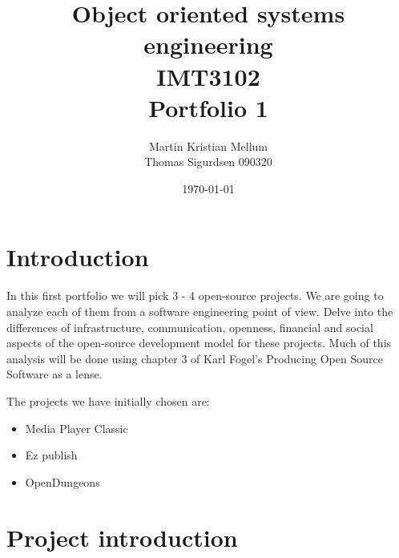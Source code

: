 \documentclass{report} %
\title{Object oriented systems engineering \\ IMT3102 \\ Portfolio 1}
\author{Martin Kristian Mellum  \\ Thomas Sigurdsen 090320} %
\date{\today}
\begin{document}
\maketitle       %
\tableofcontents %
\pagebreak	%

\section{Introduction} %
In this first portfolio we will pick 3 - 4 open-source projects. We are going to analyze each of them from a software engineering point of view. Delve into the differences of infrastructure, communication, openness, financial and social aspects of the open-source development model for these projects. Much of this analysis will be done using chapter 3 of Karl Fogel's Producing Open Source Software\cite{kfposs} as a lense.

The projects we have initially chosen are:
\begin{itemize}
\item Media Player Classic\cite{mpcweb}
\item Ez publish\cite{ezpubweb}
\item OpenDungeons\cite{odweb} %
\end{itemize}

\section{Project introduction}
\end{document}
